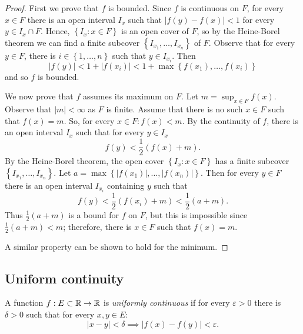 \begin{proof}
	First we prove that $f$ is bounded.
	Since $f$ is continuous on $F$,
	for every $x \in F$ there is an open interval $I_x$
	such that
	$
		\left\lvert f(y) - f(x) \right\rvert < 1
	$
	for every $y \in I_x \cap F$.
	Hence, $ \left\{ I_x: x \in F \right\} $
	is an open cover of $F$, so by the Heine-Borel theorem we can 
	find a finite subcover
	$ \left\{ I_{x_1}, \ldots, I_{x_n} \right\} $ 
	of $F$.
	Observe that for every $y \in F$,
	there is $i \in \left\{ 1, \ldots, n \right\}$
	such that $y \in I_{x_i}$.
	Then
	\[
		\left\lvert f(y) \right\rvert
		< 1 + \left\lvert f(x_i) \right\rvert
		< 1 + \max \left\{ f(x_1), \ldots, f(x_i) \right\}
	\]
	and so $f$ is bounded.
	
	We now prove that $f$ assumes its maximum on $F$.
	Let $m = \sup_{x \in F} f(x)$.
	Observe that $\left\lvert m \right\rvert < \infty$
	as $F$ is finite.
	Assume that there is no such $x \in F$ such that
	$f(x) = m$.
	So, for every $x \in F: f(x) < m$.
	By the continuity of $f$, there is an open interval
	$I_x$ such that for every $y \in I_x$
	\[
		f(y) < \frac12 \left( f(x) + m \right).
	\]
	By the Heine-Borel theorem, the open cover
	$ \left\{ I_x: x \in F \right\} $
	has a finite subcover
	$ \left\{ I_{x_1}, \ldots, I_{x_n} \right\} $.
	Let
	$
		a = \max\left\{
			\left\lvert f(x_1) \right\rvert,
			\ldots,
			\left\lvert f(x_n) \right\rvert
		\right\}.
	$
	Then for every $y \in F$ there is an open interval $I_{x_i}$
	containing $y$ such that
	\[
		f(y) < \frac12\left( f(x_i) + m \right) < \frac12(a + m).
	\]
	Thus $\frac12(a+m)$ is a bound for $f$ on $F$,
	but this is impossible since $\frac12(a+m) < m$;
	therefore, there is $x \in F$ such that $f(x) = m$.

	A similar property can be shown to hold for the minimum.
\end{proof}

\subsection{Uniform continuity}

\begin{definition}
	A function $f: E \subset \mathbb{R} \to \mathbb{R}$
	is \emph{uniformly continuous}
	if for every $\varepsilon > 0$
	there is $\delta > 0$
	such that for every $x, y \in E$:
	\[
		\left\lvert x - y \right\rvert < \delta
		\implies \left\lvert f(x) - f(y) \right\rvert < \varepsilon.
	\]
\end{definition}

